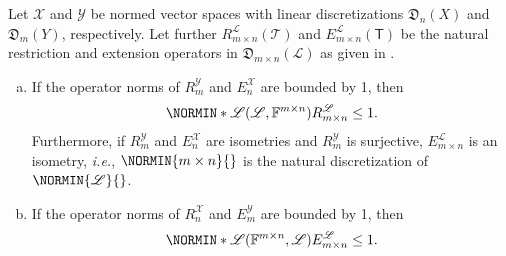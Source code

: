 \documentclass[a4paper]{paper}
\newcommand*{\SPC}[1]{{\ensuremath{\mathscr{#1}}}}
\newcommand*{\SPCL}{\SPC{L}}
\newcommand*{\SPCX}{\SPC{X}}
\newcommand*{\SPCY}{\SPC{Y}}
\newcommand*{\BLINOP}[2]{{\SPCL(#1, #2)}}
\newcommand{\FIELD}{{\ensuremath{\mathbb{F}}}}
\newcommand*{\Fmxn}{{\ensuremath{\FIELD^{m \times n}}}}
\newcommand*{\OP}[1]{{\ensuremath{\mathcal{#1}}}}
\newcommand*{\OPT}{\OP{T}}
\newcommand{\DISCOP}[1]{{\ensuremath{\mathsf{#1}}}}
\newcommand*{\DISCOPT}{\DISCOP{T}}
\newcommand*{\EXT}[2]{\ensuremath{E_{#1}^{#2}}}
\newcommand*{\REST}[2]{\ensuremath{R_{#1}^{#2}}}
\newcommand*{\RnX}{{\ensuremath{\REST{n}{\SPC{X}}}}}
\newcommand*{\RmY}{{\ensuremath{\REST{m}{\SPC{Y}}}}}
\newcommand*{\EnX}{{\ensuremath{\EXT{n}{\SPC{X}}}}}
\newcommand*{\EmY}{{\ensuremath{\EXT{m}{\SPC{Y}}}}}
\newcommand*{\DISCR}[2]{{\ensuremath{\mathfrak{D}_{#2}(#1)}}}
\newcommand*{\DISCRnX}{\DISCR{X}{n}}
\newcommand*{\DISCRmY}{\DISCR{Y}{m}}
\newcommand{\ie}{\textsl{i.e.}\xspace}
\begin{document}
\begin{lemma}
 \label{lemma:prop:norm:op_norm_est}
 Let $\SPCX$ and $\SPCY$ be normed vector spaces with linear discretizations $\DISCRnX$ and 
 $\DISCRmY$, respectively. Let further $\REST{m\times n}{\SPCL}(\OPT)$ and 
 $\EXT{m\times n}{\SPCL}(\DISCOPT)$ be the natural restriction and extension operators in 
 $\DISCR{\SPCL}{m\times n}$ as given in .
 \begin{enumerate}[(a)]
  \item \label{lemma:prop:norm:op_norm_est:a_rest}
  If the operator norms of $\RmY$ and $\EnX$ are bounded by 1, then
  \begin{equation*}
   \NORMIN*{\BLINOP{\SPCL}{\Fmxn}}{\REST{m\times n}{\SPCL}} \leq 1.
  \end{equation*}
  Furthermore, if $\RmY$ and $\EnX$ are isometries and $\RmY$ is surjective, $\EXT{m\times n}{\SPCL}$ is an 
  isometry, \ie, $\NORMIN{m\times n}{}$ is the natural discretization of $\NORMIN{\SPCL}{}$.
  
  \item \label{lemma:prop:norm:op_norm_est:b_ext}
  If the operator norms of $\RnX$ and $\EmY$ are bounded by 1, then
  \begin{equation*}
   \NORMIN*{\BLINOP{\Fmxn}{\SPCL}}{E_{m\times n}^{\SPCL}} \leq 1.
  \end{equation*}
 \end{enumerate}
\end{lemma}
\vspace{1em}
\end{document}
